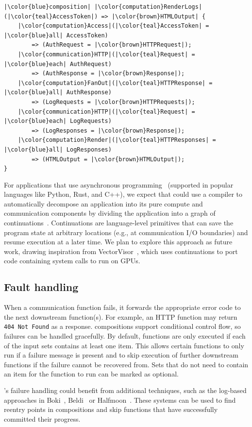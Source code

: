 \begin{lstlisting}[basicstyle=\ttfamily, style=codestyle, caption={Log processing application from Listing 1 expressed as a Dandelion composition DAG using our DSL.},captionpos=b, label={lst:middleware_composition}, float=t]
|\color{blue}composition| |\color{computation}RenderLogs|(|\color{teal}AccessToken|) => |\color{brown}HTMLOutput| {
    |\color{computation}Access|(|\color{teal}AccessToken| = |\color{blue}all| AccessToken)
        => (AuthRequest = |\color{brown}HTTPRequest|);
    |\color{communication}HTTP|(|\color{teal}Request| = |\color{blue}each| AuthRequest)
        => (AuthResponse = |\color{brown}Response|);
    |\color{computation}FanOut|(|\color{teal}HTTPResponse| = |\color{blue}all| AuthResponse)        
        => (LogRequests = |\color{brown}HTTPRequests|);
    |\color{communication}HTTP|(|\color{teal}Request| = |\color{blue}each| LogRequests)
        => (LogResponses = |\color{brown}Response|);
    |\color{computation}Render|(|\color{teal}HTTPResponses| = |\color{blue}all| LogResponses)
        => (HTMLOutput = |\color{brown}HTMLOutput|);
}
\end{lstlisting}

For applications that use asynchronous programming~\cite{rust-async} (supported in popular languages like Python, Rust, and C++), we expect that \dandelion could use a compiler to automatically decompose an application into its pure compute and communication components by dividing the application into a graph of continuations~\cite{flanaganEssenceCompilingContinuations1993}.
Continuations are language-level primitives that can save the program state at arbitrary locations (e.g., at communication I/O boundaries) and resume execution at a later time.
We plan to explore this approach as future work, drawing inspiration from VectorVisor~\cite{ginzburgVectorVisorBinaryTranslation}, which uses continuations to port code containing system calls to run on GPUs. 

\subsection{Fault handling}

When a communication function fails, it forwards the appropriate error code to the next downstream function(s).
For example, an HTTP function may return \texttt{404 Not Found} as a response.
\dandelion compositions support conditional control flow, so failures can be handled gracefully.
By default, functions are only executed if each of the input sets contains at least one item.
This allows certain functions to only run if a failure message is present and to skip execution of further downstream functions if the failure cannot be recovered from.
Sets that do not need to contain an item for the function to run can be marked as optional.

\dandelion's failure handling could benefit from additional techniques, such as the log-based approaches in Boki~\cite{jiaBokiStatefulServerless2021}, Beldi~\cite{qiHalfmoonLogOptimalFaultTolerant2023} or Halfmoon~\cite{qiHalfmoonLogOptimalFaultTolerant2023}. These systems can be used to find reentry points in compositions and skip functions that have successfully committed their progress.